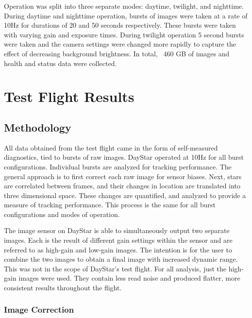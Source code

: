 \documentclass[twocolumn,letterpaper]{IEEEAerospace2012}
\begin{document}
Operation was split into three separate modes: daytime, twilight, and nighttime. During daytime and nighttime operation, bursts of images were taken at a rate of 10Hz for durations of 20 and 50 seconds respectively. These bursts were taken with varying gain and exposure times. During twilight operation 5 second bursts were taken and the camera settings were changed more rapidly to capture the effect of decreasing background brightness. In total, ~460 GB of images and health and status data were collected.

\section{Test Flight Results}

\subsection{Methodology}

All data obtained from the test flight came in the form of self-measured diagnostics, tied to bursts of raw images. DayStar operated at 10Hz for all burst configurations. Individual bursts are analyzed for tracking performance. The general approach is to first correct each raw image for sensor biases. Next, stars are correlated between frames, and their changes in location are translated into three dimensional space. These changes are quantified, and analyzed to provide a measure of tracking performance. This process is the same for all burst configurations and modes of operation.

The image sensor on DayStar is able to simultaneously output two separate images. Each is the result of different gain settings within the sensor and are referred to as high-gain and low-gain images. The intention is for the user to combine the two images to obtain a final image with increased dynamic range. This was not in the scope of DayStar's test flight. For all analysis, just the high-gain images were used. They contain less read noise and produced flatter, more consistent results throughout the flight.


\subsubsection{Image Correction}
\end{document}
